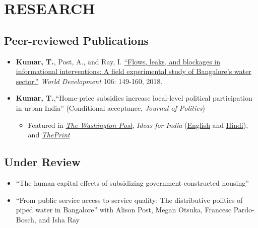 \documentclass[10pt]{article}
\begin{document}
\section*{RESEARCH}



\subsection*{Peer-reviewed Publications}
\begin{itemize}
		\item[] \textbf{Kumar, T.}, Post, A., and Ray, I. \href{https://www.sciencedirect.com/science/article/pii/S0305750X1830032}{``Flows, leaks, and blockages in informational interventions: A field experimental study of Bangalore's water sector.''} \textit{World Development} 106: 149-160, 2018.
		
			\item[] \textbf{Kumar, T.},``Home-price subsidies increase local-level political participation in urban India'' (Conditional acceptance, \textit{Journal of Politics})
			\begin{itemize}
			\item Featured in \href{https://www.washingtonpost.com/news/monkey-cage/wp/2019/01/31/heres-what-gavin-newsom-elizabeth-warren-and-microsoft-should-know-if-want-to-end-the-affordable-housing-crisis/?tid=sm_tw_cage}{\textit{The Washington Post}}, \textit{Ideas for India} (\href{https://www.ideasforindia.in/topics/poverty-inequality/household-level-effects-of-affordable-housing-evidence-from-mumbai.html}{English} and \href{https://www.ideasforindia.in/topics/poverty-inequality/household-level-effects-of-affordable-housing-evidence-from-mumbai-hindi.html}{Hindi}), and \href{https://theprint.in/opinion/mumbai-residents-win-govt-housing-lottery-and-spend-more-on-kids-education-jobs-study/290485/}{\textit{ThePrint}}
			\end{itemize}
\end{itemize}

\subsection*{Under Review}

\begin{itemize}

	\item[]``The human capital effects of subsidizing government constructed housing'' 

	
		\item[]``From public service access to service quality: The distributive politics of piped water in Bangalore'' with Alison Post, Megan Otsuka, Francesc Pardo-Bosch, and Isha Ray 
	
		\end{itemize}
		
\end{document}

